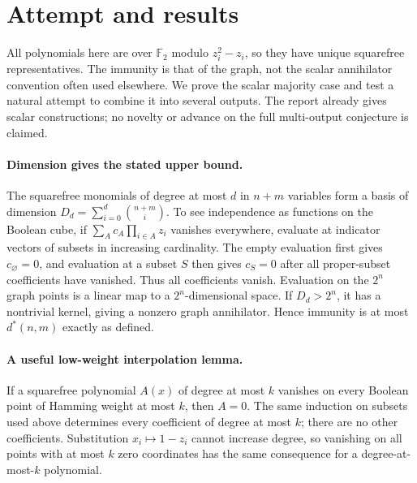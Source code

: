 \documentclass[11pt]{article}
\begin{document}
\section{Attempt and results}
All polynomials here are over $\mathbb F_2$ modulo $z_i^2-z_i$, so they
have unique squarefree representatives. The immunity is that of the graph,
not the scalar annihilator convention often used elsewhere. We prove the
scalar majority case and test a natural attempt to combine it into several
outputs. The report already gives scalar constructions; no novelty or advance
on the full multi-output conjecture is claimed.

\paragraph{Dimension gives the stated upper bound.}
The squarefree monomials of degree at most $d$ in $n+m$ variables form a
basis of dimension $D_d=\sum_{i=0}^d\binom{n+m}{i}$.
To see independence as functions on the Boolean cube, if
$\sum_A c_A\prod_{i\in A}z_i$ vanishes everywhere, evaluate at indicator
vectors of subsets in increasing cardinality. The empty evaluation first gives
$c_\varnothing=0$, and evaluation at a subset $S$ then gives $c_S=0$ after
all proper-subset coefficients have vanished. Thus all coefficients vanish.
Evaluation on the $2^n$ graph points is a linear map to a $2^n$-dimensional
space. If $D_d>2^n$, it has a nontrivial kernel, giving a nonzero graph
annihilator. Hence immunity is at most $d^*(n,m)$ exactly as defined.

\paragraph{A useful low-weight interpolation lemma.}
If a squarefree polynomial $A(x)$ of degree at most $k$ vanishes on every
Boolean point of Hamming weight at most $k$, then $A=0$. The same induction
on subsets used above determines every coefficient of degree at most $k$;
there are no other coefficients. Substitution $x_i\mapsto1-z_i$ cannot
increase degree, so vanishing on all points with at most $k$ zero coordinates
has the same consequence for a degree-at-most-$k$ polynomial.
\end{document}
